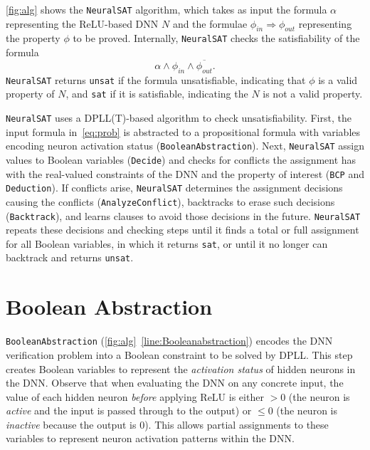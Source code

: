 \documentclass[oneside,11pt,dvipsnames]{book}
\numberwithin{equation}{section}
\theoremstyle{definition}
\theoremstyle{remark}
\newcommand{\tool}{\texttt{NeuralSAT}}
\begin{document}
\autoref{fig:alg} shows the \tool{} algorithm, which takes as input the formula $\alpha$ representing the ReLU-based DNN $N$ and the formulae $\phi_{in}\Rightarrow \phi_{out}$ representing the property $\phi$ to be proved.
Internally, \tool{} checks the satisfiability of the formula
\begin{equation}\label{eq:prob}
  \alpha \land \phi_{in} \land \overline{\phi_{out}}.
\end{equation}
\tool{} returns \texttt{unsat} if the formula unsatisfiable, indicating  that $\phi$ is a valid property of $N$, and \texttt{sat} if it is satisfiable, indicating the $N$ is not a valid property.

\tool{} uses a  DPLL(T)-based algorithm to check unsatisfiability.
First, the input formula in~\autoref{eq:prob} is abstracted to a propositional formula
with variables encoding neuron activation status (\texttt{BooleanAbstraction}).
Next, \tool{} assign values to Boolean variables (\texttt{Decide}) and checks for conflicts the assignment has with the real-valued constraints of the DNN and the property of interest (\texttt{BCP} and \texttt{Deduction}).
If conflicts arise, \tool{} determines the assignment decisions causing the conflicts (\texttt{AnalyzeConflict}), backtracks to erase such decisions (\texttt{Backtrack}), and learns clauses to avoid those decisions in the future.
\tool{} repeats these decisions and checking steps until it finds a total or full assignment for all Boolean variables, in which it returns \texttt{sat}, or until it no longer can backtrack and returns \texttt{unsat}.




\section{Boolean Abstraction}
\texttt{BooleanAbstraction} (\autoref{fig:alg}~\autoref{line:Booleanabstraction}) encodes the DNN verification problem into a Boolean constraint to be solved by DPLL.  This step creates Boolean variables to represent the \emph{activation status} of hidden neurons in the DNN. Observe that when evaluating the DNN on any concrete input, the value of each hidden neuron \emph{before} applying ReLU is either $>0$ (the neuron is \emph{active} and the input is passed through to the output) or $\le 0$ (the neuron is \emph{inactive} because the output is 0).
This allows partial assignments to these variables to represent neuron activation patterns within the DNN.
\end{document}
